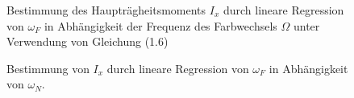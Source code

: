 \documentclass[12pt,a4paper,german]{scrartcl}
\numberwithin{equation}{section}
\begin{document}
  \begin{figure}[H]
    \centering
    
    \caption{Bestimmung des Haupträgheitsmoments $I_x$ durch lineare Regression von $\omega_F$ in Abhängigkeit der Frequenz des Farbwechsels $\Omega$ unter Verwendung von Gleichung (1.6)}
    \label{fig_I_x_1}
  \end{figure}

  \begin{figure}[H]
    \centering
    
    \caption{Bestimmung von $I_x$ durch lineare Regression von $\omega_F$ in Abhängigkeit von $\omega_N$.}
    \label{fig_I_x_2}
  \end{figure}
\end{document}
